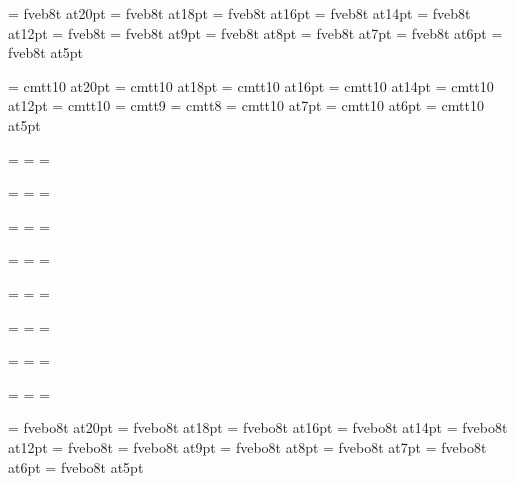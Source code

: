 \font\twentybf=     fveb8t at20pt
\font\eighteenbf=   fveb8t at18pt
\font\sixteenbf=    fveb8t at16pt
\font\fourteenbf=   fveb8t at14pt
\font\twelvebf=     fveb8t at12pt
\font\tenbf=        fveb8t
\font\ninebf=       fveb8t at9pt
\font\eightbf=      fveb8t at8pt
\font\sevenbf=      fveb8t at7pt
\font\sixbf=        fveb8t at6pt
\font\fivebf=       fveb8t at5pt

\font\twentytt=     cmtt10 at20pt
\font\eighteentt=   cmtt10 at18pt
\font\sixteentt=    cmtt10 at16pt
\font\fourteentt=   cmtt10 at14pt
\font\twelvett=     cmtt10 at12pt
\font\tentt=        cmtt10
\font\ninett=       cmtt9
\font\eighttt=      cmtt8
\font\seventt=      cmtt10 at7pt
\font\sixtt=        cmtt10 at6pt
\font\fivett=       cmtt10 at5pt




=\tenrm
{}=\sevenrm
{}=\fiverm
\def\rm{\fam=0 \tenrm}

=\eleveni
{}=\eighti
{}=\sixi
\def\mit{\fam=1}

=\elevensy
{}=\eightsy
{}=\sixsy
\def\cal{\fam=2}

=\elevenex
{}=\eightex
{}=\sixex


\def\it{\fam=\itfam \tenit}
\textfont\itfam=\tenit
\scriptfont\itfam=\sevenit
\scriptscriptfont\itfam=\fiveit

\def\sl{\fam=\slfam \tensl}
\textfont\slfam=\tensl
\scriptfont\slfam=\sevensl
\scriptscriptfont\slfam=\fivesl

\def\bf{\fam=\bffam \tenbf}
\textfont\bffam=\tenbf
\scriptfont\bffam=\sevenbf
\scriptscriptfont\bffam=\fivebf

\def\tt{\fam=\ttfam \tentt}
\textfont\ttfam=\tentt
\scriptfont\ttfam=\seventt
\scriptscriptfont\ttfam=\fivett

\font\twentyitbf=      fvebo8t at20pt
\font\eighteenitbf=    fvebo8t at18pt
\font\sixteenitbf=     fvebo8t at16pt
\font\fourteenitbf=    fvebo8t at14pt
\font\twelveitbf=      fvebo8t at12pt
\font\itbf=            fvebo8t
\font\nineitbf=        fvebo8t at9pt
\font\eightitbf=       fvebo8t at8pt
\font\sevenitbf=       fvebo8t at7pt
\font\sixitbf=         fvebo8t at6pt
\font\fiveitbf=        fvebo8t at5pt

